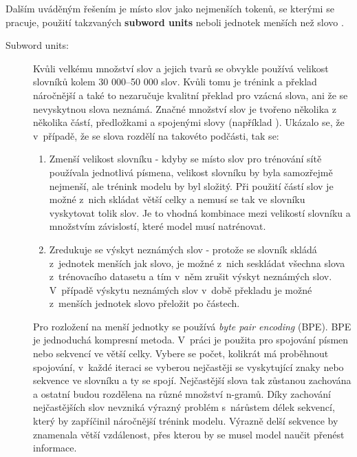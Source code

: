 Dalším uváděným řešením je místo slov jako nejmenších tokenů, se kterými se pracuje, použití takzvaných \textbf{subword units} neboli jednotek menších než slovo \cite{subwords}.

\begin{description}
  \item[Subword units:]\label{subsection:subwords} Kvůli velkému množství slov a jejich tvarů se obvykle používá velikost slovníků kolem 30 000--50 000 slov. Kvůli tomu je trénink a překlad náročnější a také to nezaručuje kvalitní překlad pro vzácná slova, ani že se nevyskytnou slova neznámá. Značné množství slov je tvořeno několika z několika částí, předložkami a spojenými slovy (například ). Ukázalo se, že v~případě, že se slova rozdělí na takovéto podčásti, tak se:

      \begin{enumerate}
        \item Zmenší velikost slovníku - kdyby se místo slov pro trénování sítě používala jednotlivá písmena, velikost slovníku by byla samozřejmě nejmenší, ale trénink modelu by byl složitý. Při použití částí slov je možné z~nich skládat větší celky a nemusí se tak ve slovníku vyskytovat tolik slov. Je to vhodná kombinace mezi velikostí slovníku a množstvím závislostí, které model musí natrénovat.
        \item Zredukuje se výskyt neznámých slov - protože se slovník skládá z~jednotek menších jak slovo, je možné z~nich seskládat všechna slova z~trénovacího datasetu a tím v~něm zrušit výskyt neznámých slov. V~případě výskytu neznámých slov v~době překladu je možné z~menších jednotek slovo přeložit po částech.
      \end{enumerate}

      Pro rozložení na menší jednotky se používá \emph{byte pair encoding} (BPE). BPE je jednoduchá kompresní metoda. V~práci \cite{subwords} je použita pro spojování písmen nebo sekvencí ve větší celky. Vybere se počet, kolikrát má proběhnout spojování, v~každé iteraci se vyberou nejčastěji se vyskytující znaky nebo sekvence ve slovníku a ty se spojí. Nejčastější slova tak zůstanou zachována a ostatní budou rozdělena na různé množství n-gramů. Díky zachování nejčastějších slov nevzniká výrazný problém s~nárůstem délek sekvencí, který by zapříčinil náročnější trénink modelu. Výrazně delší sekvence by znamenala větší vzdálenost, přes kterou by se musel model naučit přenést informace.
\end{description}

